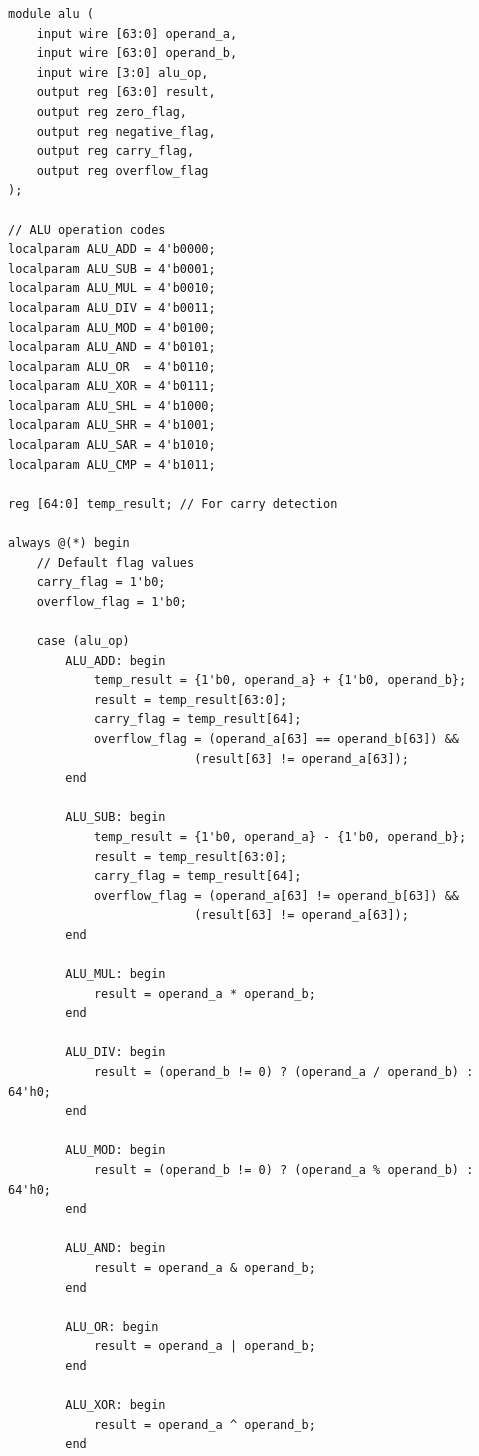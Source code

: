 \documentclass[12pt,a4paper,oneside]{book}
\begin{document}
\begin{lstlisting}[style=verilog, caption={ALU Implementation}, label={lst:alu}]
module alu (
    input wire [63:0] operand_a,
    input wire [63:0] operand_b,
    input wire [3:0] alu_op,
    output reg [63:0] result,
    output reg zero_flag,
    output reg negative_flag,
    output reg carry_flag,
    output reg overflow_flag
);

// ALU operation codes
localparam ALU_ADD = 4'b0000;
localparam ALU_SUB = 4'b0001;
localparam ALU_MUL = 4'b0010;
localparam ALU_DIV = 4'b0011;
localparam ALU_MOD = 4'b0100;
localparam ALU_AND = 4'b0101;
localparam ALU_OR  = 4'b0110;
localparam ALU_XOR = 4'b0111;
localparam ALU_SHL = 4'b1000;
localparam ALU_SHR = 4'b1001;
localparam ALU_SAR = 4'b1010;
localparam ALU_CMP = 4'b1011;

reg [64:0] temp_result; // For carry detection

always @(*) begin
    // Default flag values
    carry_flag = 1'b0;
    overflow_flag = 1'b0;
    
    case (alu_op)
        ALU_ADD: begin
            temp_result = {1'b0, operand_a} + {1'b0, operand_b};
            result = temp_result[63:0];
            carry_flag = temp_result[64];
            overflow_flag = (operand_a[63] == operand_b[63]) && 
                          (result[63] != operand_a[63]);
        end
        
        ALU_SUB: begin
            temp_result = {1'b0, operand_a} - {1'b0, operand_b};
            result = temp_result[63:0];
            carry_flag = temp_result[64];
            overflow_flag = (operand_a[63] != operand_b[63]) && 
                          (result[63] != operand_a[63]);
        end
        
        ALU_MUL: begin
            result = operand_a * operand_b;
        end
        
        ALU_DIV: begin
            result = (operand_b != 0) ? (operand_a / operand_b) : 64'h0;
        end
        
        ALU_MOD: begin
            result = (operand_b != 0) ? (operand_a % operand_b) : 64'h0;
        end
        
        ALU_AND: begin
            result = operand_a & operand_b;
        end
        
        ALU_OR: begin
            result = operand_a | operand_b;
        end
        
        ALU_XOR: begin
            result = operand_a ^ operand_b;
        end
        

\end{lstlisting}
\end{document}
